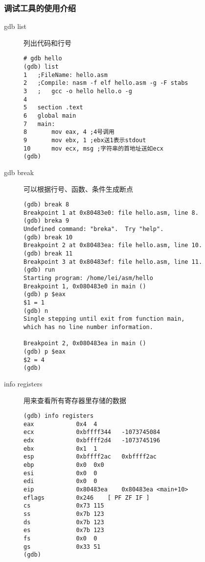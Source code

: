 \documentclass{article}
\begin{document}
\subsubsection{调试工具的使用介绍}

\begin{description}
\item[gdb list]列出代码和行号
\newline
\begin{verbatim}
# gdb hello
(gdb) list
1	;FileName: hello.asm
2	;Compile: nasm -f elf hello.asm -g -F stabs
3	;	gcc -o hello hello.o -g
4	
5	section .text
6	global main
7	main:
8		mov eax, 4 ;4号调用
9		mov ebx, 1 ;ebx送1表示stdout
10		mov ecx, msg ;字符串的首地址送如ecx
(gdb) 

\end{verbatim}
\item[gdb break]可以根据行号、函数、条件生成断点
\newline
\begin{verbatim}
(gdb) break 8
Breakpoint 1 at 0x80483e0: file hello.asm, line 8.
(gdb) breka 9
Undefined command: "breka".  Try "help".
(gdb) break 10
Breakpoint 2 at 0x80483ea: file hello.asm, line 10.
(gdb) break 11
Breakpoint 3 at 0x80483ef: file hello.asm, line 11.
(gdb) run
Starting program: /home/lei/asm/hello 
Breakpoint 1, 0x080483e0 in main ()
(gdb) p $eax
$1 = 1
(gdb) n
Single stepping until exit from function main,
which has no line number information.

Breakpoint 2, 0x080483ea in main ()
(gdb) p $eax
$2 = 4
(gdb) 
\end{verbatim}
\item[info registers]用来查看所有寄存器里存储的数据
\newline

\begin{verbatim}
(gdb) info registers
eax            0x4	4
ecx            0xbffff344	-1073745084
edx            0xbffff2d4	-1073745196
ebx            0x1	1
esp            0xbffff2ac	0xbffff2ac
ebp            0x0	0x0
esi            0x0	0
edi            0x0	0
eip            0x80483ea	0x80483ea <main+10>
eflags         0x246	[ PF ZF IF ]
cs             0x73	115
ss             0x7b	123
ds             0x7b	123
es             0x7b	123
fs             0x0	0
gs             0x33	51
(gdb) 
\end{verbatim}
\end{description}
\end{document}
